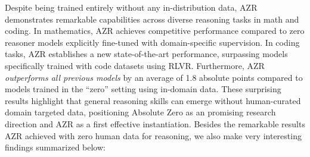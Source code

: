 \documentclass{article}
\begin{document}
Despite being trained entirely without any in-distribution data, AZR demonstrates remarkable capabilities across diverse reasoning tasks in math and coding. In mathematics, AZR achieves competitive performance compared to zero reasoner models explicitly fine-tuned with domain-specific supervision. In coding tasks, AZR establishes a new state-of-the-art performance, surpassing models specifically trained with code datasets using RLVR. Furthermore, AZR \emph{outperforms all previous models} by an average of 1.8 absolute points compared to models trained in the ``zero'' setting using in-domain data. These surprising results highlight that general reasoning skills can emerge without human-curated domain targeted data, positioning Absolute Zero as an promising research direction and AZR as a first effective instantiation. Besides the remarkable results AZR achieved with zero human data for reasoning, we also make very interesting findings summarized below:
\end{document}
